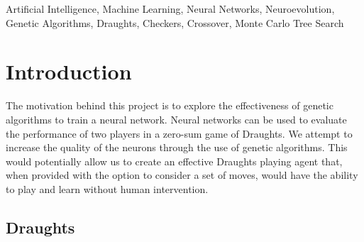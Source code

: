 \documentclass[12pt,a4paper]{article}
\begin{document}
\begin{abstract}
    {\bf Results}

    Overall, the neuroevolutionary approach has shown to learn and improve over time. The net learning rate was positive. However, the wide scope of the adjustments afforded may have impacted the learning rate and has consequently shown to be volatile in some situations. The use of crossovers may dramatically influence the quality of the learning.

    {\bf Conclusion}

    Under the premise that the tournament requirements are well-defined, neuroevolution can be considered as an option to create a draughts playing AI. However, the robustness of the system is quite volatile. To counteract this, the system is  best paired with mutation and crossover methods that are not heavily reliant on entropy.

\end{abstract}
\begin{keywords}
    Artificial Intelligence, Machine Learning, Neural Networks, Neuroevolution, Genetic Algorithms, Draughts, Checkers, Crossover, Monte Carlo Tree Search
\end{keywords}
\section{Introduction}
    The motivation behind this project is to explore the effectiveness of genetic algorithms to train a neural network. Neural networks can be used to evaluate the performance of two players in a zero-sum game of Draughts. We attempt to increase the quality of the neurons through the use of genetic algorithms. This would potentially allow us to create an effective Draughts playing agent that, when provided with the option to consider a set of moves, would have the ability to play and learn without human intervention.

    \subsection{Draughts}
\end{document}
